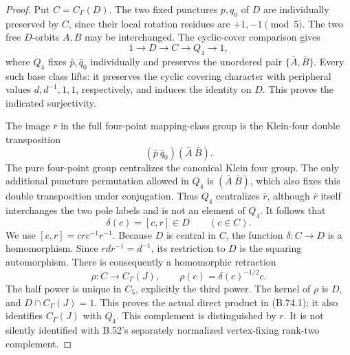 \begin{proof}
Put \(C=C_\Gamma(D)\).  The two fixed punctures \(p,q_0\)
of \(D\) are individually preserved by \(C\), since their
local rotation residues are \(+1,-1\pmod5\).
The two free \(D\)-orbits \(A,B\) may be interchanged.
The cyclic-cover comparison gives
\[
        1\longrightarrow D\longrightarrow C
           \longrightarrow Q_4\longrightarrow1,               \tag{B.74.3}
\]
where \(Q_4\) fixes \(\bar p,\bar q_0\) individually and
preserves the unordered pair \(\{\bar A,\bar B\}\).
Every such base class lifts: it preserves the cyclic
covering character with peripheral values
\(d,d^{-1},1,1\), respectively, and induces the identity
on \(D\).  This proves the indicated surjectivity.

The image \(\bar r\) in the full four-point mapping-class
group is the Klein-four double transposition
\[
                 (\bar p\ \bar q_0)(\bar A\ \bar B).
\]
The pure four-point group centralizes the canonical
Klein four group.  The only additional puncture
permutation allowed in \(Q_4\) is
\((\bar A\ \bar B)\), which also fixes this
double transposition under conjugation.
Thus \(Q_4\) centralizes \(\bar r\), although \(\bar r\)
itself interchanges the two pole labels and is not an
element of \(Q_4\).
It follows that
\[
                 \delta(c)=[c,r]\in D\qquad(c\in C).             \tag{B.74.4}
\]
We use \([c,r]=crc^{-1}r^{-1}\).
Because \(D\) is central in \(C\), the function
\(\delta:C\to D\) is a homomorphism.
Since \(rdr^{-1}=d^{-1}\), its restriction to \(D\)
is the squaring automorphism.
There is consequently a homomorphic retraction
\[
             \rho:C\longrightarrow C_\Gamma(J),
             \qquad
             \rho(c)=\delta(c)^{-1/2}c.                         \tag{B.74.5}
\]
The half power is unique in \(C_5\), explicitly the
third power.  The kernel of \(\rho\) is \(D\),
and \(D\cap C_\Gamma(J)=1\).
This proves the actual direct product in (B.74.1);
it also identifies \(C_\Gamma(J)\) with \(Q_4\).
This complement is distinguished by \(r\).
It is not silently identified with B.52's separately
normalized vertex-fixing rank-two complement.


\end{proof}
